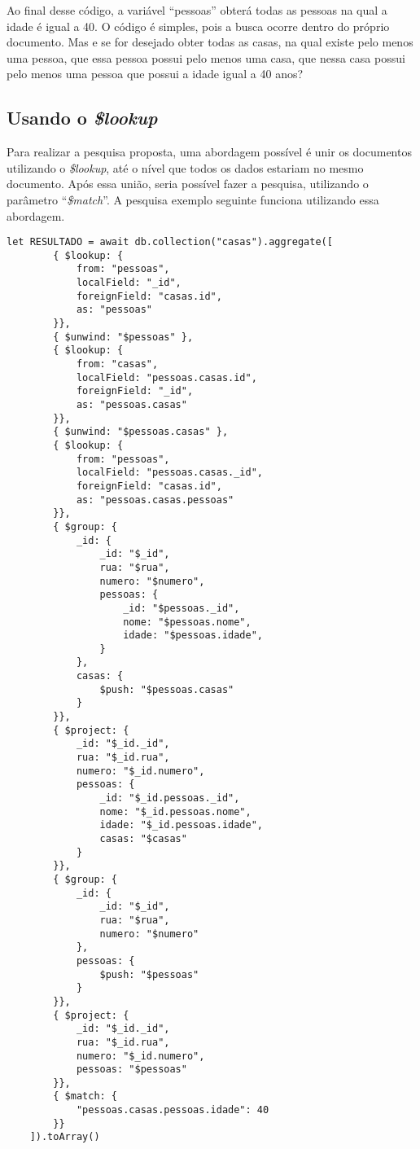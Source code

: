 Ao final desse código, a variável ``pessoas'' obterá todas as pessoas na qual a idade é igual a 40. O código é simples, pois a busca ocorre dentro do próprio documento. Mas e se for desejado obter todas as casas, na qual existe pelo menos uma pessoa, que essa pessoa possui pelo menos uma casa, que nessa casa possui pelo menos uma pessoa que possui a idade igual a 40 anos?

\subsection{Usando o \textit{\$lookup}}

Para realizar a pesquisa proposta, uma abordagem possível é unir os documentos utilizando o \textit{\$lookup}, até o nível que todos os dados estariam no mesmo documento. Após essa união, seria possível fazer a pesquisa, utilizando o parâmetro ``\textit{\$match}''. A pesquisa exemplo seguinte funciona utilizando essa abordagem.

\begin{lstlisting}[style=ES6, caption={Busca em Dados Normalizados Com o \textit{\$lookup}}]
    let RESULTADO = await db.collection("casas").aggregate([
        { $lookup: {
            from: "pessoas",
            localField: "_id",
            foreignField: "casas.id",
            as: "pessoas"
        }},
        { $unwind: "$pessoas" },
        { $lookup: {
            from: "casas",
            localField: "pessoas.casas.id",
            foreignField: "_id",
            as: "pessoas.casas"
        }},
        { $unwind: "$pessoas.casas" },
        { $lookup: {
            from: "pessoas",
            localField: "pessoas.casas._id",
            foreignField: "casas.id",
            as: "pessoas.casas.pessoas"
        }},
        { $group: {
            _id: {
                _id: "$_id",
                rua: "$rua",
                numero: "$numero",
                pessoas: {
                    _id: "$pessoas._id",
                    nome: "$pessoas.nome",
                    idade: "$pessoas.idade",
                }
            },
            casas: {
                $push: "$pessoas.casas"
            }
        }},
        { $project: {
            _id: "$_id._id",
            rua: "$_id.rua",
            numero: "$_id.numero",
            pessoas: {
                _id: "$_id.pessoas._id",
                nome: "$_id.pessoas.nome",
                idade: "$_id.pessoas.idade",
                casas: "$casas"
            }
        }},
        { $group: {
            _id: {
                _id: "$_id",
                rua: "$rua",
                numero: "$numero"
            },
            pessoas: {
                $push: "$pessoas"
            }
        }},
        { $project: {
            _id: "$_id._id",
            rua: "$_id.rua",
            numero: "$_id.numero",
            pessoas: "$pessoas"
        }},
        { $match: {
            "pessoas.casas.pessoas.idade": 40
        }}
    ]).toArray()
\end{lstlisting}

